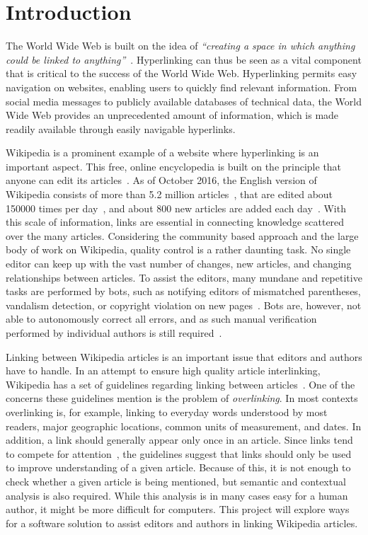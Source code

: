 \chapter{Introduction}\label{ch:introduction}
The World Wide Web is built on the idea of \emph{``creating a space in which anything could be linked to anything''}~\cite[p.~4]{Weaving-the-web}. Hyperlinking can thus be seen as a vital component that is critical to the success of the World Wide Web. Hyperlinking permits easy navigation on websites, enabling users to quickly find relevant  information. From social media messages to publicly available databases of technical data, the World Wide Web provides an unprecedented amount of information, which is made readily available through easily navigable hyperlinks.

Wikipedia is a prominent example of a website where hyperlinking is an important aspect. This free, online encyclopedia is built on the principle that anyone can edit its articles~\cite{wiki-about}. As of October 2016, the English version of Wikipedia consists of more than 5.2 million articles~\cite{wiki-about}, that are edited about \num{150000} times per day~\cite{wiki-num-edits}, and about 800 new articles are added each day~\cite{wmcharts}. With this scale of information, links are essential in connecting knowledge scattered over the many articles. Considering the community based approach and the large body of work on Wikipedia, quality control is a rather daunting task. No single editor can keep up with the vast number of changes, new articles, and changing relationships between articles. To assist the editors, many mundane and repetitive tasks are performed by bots, such as notifying editors of mismatched parentheses, vandalism detection, or copyright violation on new pages~\cite{wiki-bots}. Bots are, however, not able to autonomously correct all errors, and as such manual verification performed by individual authors is still required~\cite{wiki-bot-policy}.

Linking between Wikipedia articles is an important issue that editors and authors have to handle. In an attempt to ensure high quality article interlinking, Wikipedia has a set of guidelines regarding linking between articles~\cite{wiki-editor-guidelines}. One of the concerns these guidelines mention is the problem of \emph{overlinking}. In most contexts overlinking is, for example, linking to everyday words understood by most readers, major geographic locations, common units of measurement, and dates. In addition, a link should generally appear only once in an article. Since links tend to compete for attention~\cite{hyperlink-structure-using-logs}, the guidelines suggest that links should only be used to improve understanding of a given article. Because of this, it is not enough to check whether a given article is being mentioned, but semantic and contextual analysis is also required. While this analysis is in many cases easy for a human author, it might be more difficult for computers. This project will explore ways for a software solution to assist editors and authors in linking Wikipedia articles.






